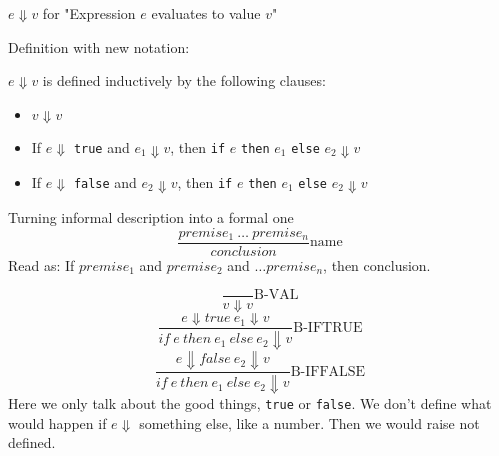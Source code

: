 \documentclass[11pt]{article}
\begin{document}
\(e \Downarrow v\) for "Expression \(e\) evaluates to value \(v\)"

Definition with new notation:

\(e \Downarrow v\) is defined inductively by the following clauses:
\begin{itemize}
\item \(v \Downarrow v\)
\item If \(e \Downarrow\) \texttt{true} and \(e_1 \Downarrow v\), then \texttt{if} \(e\) \texttt{then} \(e_1\) \texttt{else} \(e_2 \Downarrow v\)
\item If \(e \Downarrow\) \texttt{false} and \(e_2 \Downarrow v\), then \texttt{if} \(e\) \texttt{then} \(e_1\) \texttt{else} \(e_2 \Downarrow v\)
\end{itemize}

Turning informal description into a formal one
$$\frac{premise_1 \ \ldots \ premise_n}{conclusion}\text{name}$$
Read as: If \(premise_1\) and \(premise_2\) and \(\ldots premise_n\), then conclusion.

$$\frac{}{v \Downarrow v}\text{B-VAL}$$
$$\frac{e \Downarrow true \ e_1 \Downarrow v}{if \ e \ then \ e_1 \ else \ e_2 \Downarrow v}\text{B-IFTRUE}$$
$$\frac{e \Downarrow false \ e_2 \Downarrow v}{if \ e \ then \ e_1 \ else \ e_2 \Downarrow v}\text{B-IFFALSE}$$
Here we only talk about the good things, \texttt{true} or \texttt{false}. We don't define what would happen if \(e \Downarrow\) something else, like a number. Then we would raise not defined.
\end{document}
